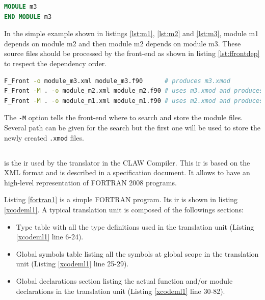\begin{lstlisting}[label=lst:m3, language=Fortran, caption=module\_m3.f90]
MODULE m3
END MODULE m3
\end{lstlisting}

In the simple example shown in listings \ref{lst:m1}, \ref{lst:m2} and
\ref{lst:m3}, module m1 depends on module m2 and then module m2
depends on module m3. These source files should be processed by the front-end
as shown in listing \ref{lst:ffrontdep} to respect the dependency order.

\begin{lstlisting}[label=lst:ffrontdep, language=Bash, caption=Parse module with dependencies]
F_Front -o module_m3.xml module_m3.f90      # produces m3.xmod
F_Front -M . -o module_m2.xml module_m2.f90 # uses m3.xmod and produces m2.xmod
F_Front -M . -o module_m1.xml module_m1.f90 # uses m2.xmod and produces m1.xmod
\end{lstlisting}

The \lstinline|-M| option tells the front-end where to search and store the
module files. Several path can be given for the search but the first one will
be used to store the newly created \lstinline|.xmod| files.


\subsection{\xcodeml}
\xcodeml is the \gls{ir} used by the
translator in the CLAW Compiler. This \gls{ir} is based on the XML
format and is described in a specification
document\cite{omni:xcodemlf95,omni:xcodemlf2008}. It allows to have an
high-level representation of FORTRAN 2008 programs.

Listing \ref{fortran1} is a simple FORTRAN program. Its \xcodeml \gls{ir} is
shown in listing \ref{xcodeml1}. A typical \xcodeml translation unit is
composed of the followings sections:
\begin{itemize}
\item Type table with all the type definitions used in the translation unit
(Listing \ref{xcodeml1} line 6-24).
\item Global symbols table listing all the symbols at global scope in the
translation unit (Listing
\ref{xcodeml1} line 25-29).
\item Global declarations section listing the actual function and/or module
declarations in the translation unit (Listing \ref{xcodeml1} line 30-82).
\end{itemize}

